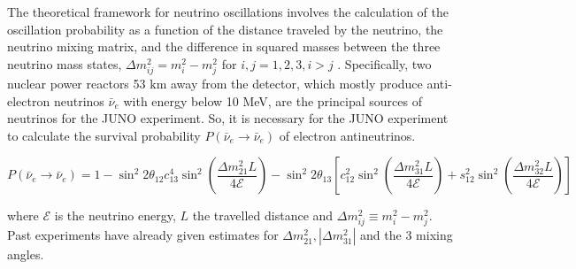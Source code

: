 The theoretical framework for neutrino oscillations involves the calculation of the oscillation probability as a function of the distance traveled by the neutrino, the neutrino mixing matrix, and the difference in squared masses between the three neutrino mass states, $\Delta m_{ij}^2 = m^2_i - m^2_j$ for $i,j = 1,2,3, i>j$ . Specifically, two nuclear power reactors 53 $\unit{\kilo\meter}$ away from the detector, which mostly produce anti-electron neutrinos $\bar{\nu}_e$ with energy below 10 MeV, are the principal sources of neutrinos for the JUNO experiment. So, it is necessary for the JUNO experiment to calculate the survival probability $P\left(\bar{\nu}_e \rightarrow \bar{\nu}_e\right)$ of electron antineutrinos.

\begin{equation*}
	P\left(\bar{\nu}_e \rightarrow \bar{\nu}_e\right)=1-\sin ^2 2 \theta_{12} c_{13}^4 \sin ^2\left(\frac{\Delta m_{21}^2 L}{4 \mathcal{E}}\right)-\sin ^2 2 \theta_{13}\left[c_{12}^2 \sin ^2\left(\frac{\Delta m_{31}^2 L}{4 \mathcal{E}}\right)+s_{12}^2 \sin ^2\left(\frac{\Delta m_{32}^2 L}{4 \mathcal{E}}\right)\right]
\end{equation*}

where $\mathcal{E}$ is the neutrino energy, $L$ the travelled distance and $\Delta m_{i j}^2 \equiv m_i^2-m_j^2$. \\
Past experiments have already given estimates for  $\Delta m_{21}^2,\left|\Delta m_{31}^2\right|$ and the  3 mixing angles.


